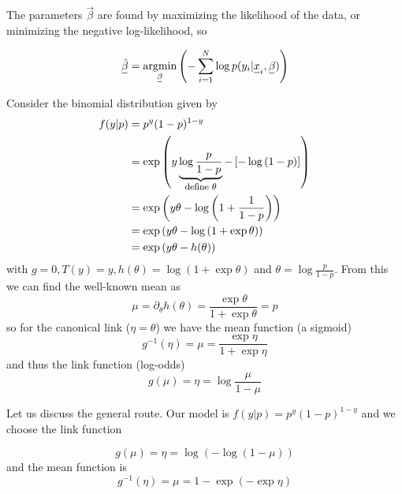 The parameters $\vec{\beta}$ are found by maximizing the likelihood of the data,
or minimizing the negative log-likelihood, so

\begin{equation}
    \vec{\hat{\beta}} = \argmin_{\vec{\beta}} \left( - \sum_{i=1}^N \log{p(y_i | \vec{x}_i, \vec{\beta})} \right)
\end{equation}

Consider the binomial distribution given by
\begin{equation}
    \begin{aligned}
        f(y|p) &= p^y(1-p)^{1-y} \\
               &= \exp{\left( y \explain{\log{\frac{p}{1-p}}}{define $\theta$} - \left[ - \log{(1-p)} \right] \right)} \\
               &= \exp{\left( y \theta - \log{\left(1 + \frac{1}{1-p}\right)} \right)} \\
               &= \exp{\left( y \theta - \log{\left(1 + \exp{\theta}\right)} \right)} \\
               &= \exp{\left( y \theta - h(\theta) \right)}
    \end{aligned}
\end{equation}
with $g = 0, T(y) = y, h(\theta) = \log{\left(1 + \exp{\theta}\right)}$ and $\theta = \log{\frac{p}{1-p}}$. From this we can find the well-known mean as
\begin{equation}
    \mu = \partial_{\theta} h(\theta) = \frac{\exp{\theta}}{1 + \exp{\theta}} = p
\end{equation}
so for the canonical link ($\eta = \theta$) we have the mean function (a sigmoid)
\begin{equation}
    g^{-1}(\eta) = \mu = \frac{\exp{\eta}}{1 + \exp{\eta}}
\end{equation}
and thus the link function (log-odds)
\begin{equation}
    g(\mu) = \eta = \log{\frac{\mu}{1-\mu}}
\end{equation}

Let us discuss the general route. Our model is $f(y|p) = p^y (1-p)^{1-y}$ and we choose the link function

\begin{equation}
    g(\mu) = \eta = \log{\left( - \log{(1-\mu)} \right)}
\end{equation}
and the mean function is
\begin{equation}
    g^{-1}(\eta) = \mu = 1 - \exp{\left( - \exp{\eta} \right)}
\end{equation}

